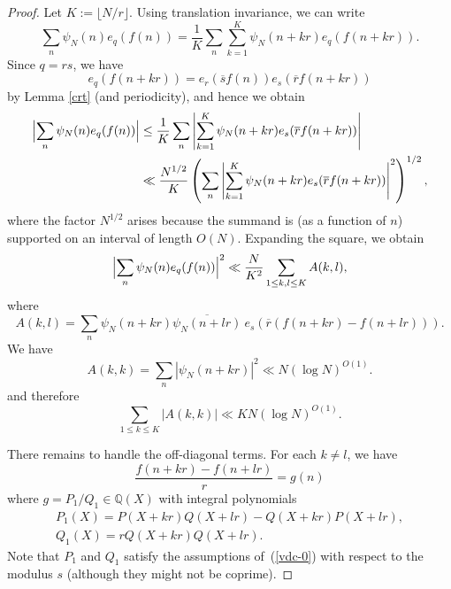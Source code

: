 \documentclass[12pt,a4paper,reqno]{amsart}
\numberwithin{equation}{section}
\theoremstyle{plain}
\theoremstyle{definition}
\newcommand\Q{\mathbb{Q}}
\renewcommand{\lessapprox}{\llcurly}
\begin{document}
\begin{proof}
Let $K := \lfloor N/r\rfloor$.  Using translation invariance, we can
write
$$
\sum_n \psi_N(n)e_q(f(n))=\frac{1}{K} \sum_n \sum_{k=1}^K
\psi_N(n+kr) e_q(f(n+kr)).
$$
Since $q=rs$, we have 
$$
e_q(f(n+kr)) = e_{r}(\overline{s} f(n))e_{s}( \overline{r} f(n+kr) )
$$
by Lemma \ref{crt} (and periodicity), and hence we obtain
\begin{align*}
  \Bigl|\sum_n \psi_N(n) e_q(f(n))\Bigr| &\leq
  \frac{1}{K} \sum_n \left|\sum_{k=1}^K \psi_N(n+kr) e_{s}( \overline{r} f(n+kr) )\right| \\
  & \ll \frac{N^{1/2}}{K} \left(\sum_n \left|\sum_{k=1}^K \psi_N(n+kr)
      e_{s}( \overline{r} f(n+kr) )\right|^2\right)^{1/2},
\end{align*}
where the factor $N^{1/2}$ arises because the summand is (as a
function of $n$) supported on an interval of length $O(N)$.  Expanding
the square, we obtain
\begin{equation}\label{eq-square-sum}
\Bigl|\sum_n \psi_N(n) e_q(f(n))\Bigr|^2\ll  \frac{N}{K^2}
\sum_{1\leq k,l\leq K}A(k,l),
\end{equation}
where
$$
A(k,l)=\sum_n \psi_N(n+kr) \overline{\psi_N(n+lr)}\
e_{s}\left(\overline{r} (f(n+kr) - f(n+lr) ) \right).
$$
We have
$$
A(k,k)=\sum_n |\psi_N(n+kr)|^2\ll N(\log N)^{O(1)}.
$$
and therefore 
\begin{equation}\label{eq-diag}
\sum_{1\leq k\leq K} |A(k,k)|\ll KN(\log N)^{O(1)}.
\end{equation}

There remains to handle the off-diagonal terms. For each $k\neq l$, we
have
$$
\frac{f(n+kr) - f(n+lr)}{r}=g(n)
$$
where $g=P_1/Q_1\in \Q(X)$ with integral polynomials
\begin{gather*}
P_1(X)=P(X+kr)Q(X+lr)-Q(X+kr)P(X+lr),\\
Q_1(X)=rQ(X+kr)Q(X+lr).
\end{gather*}
Note that $P_1$ and $Q_1$ satisfy the assumptions of~(\ref{vdc-0})
with respect to the modulus $s$ (although they might not be coprime).


\end{proof}
\end{document}
